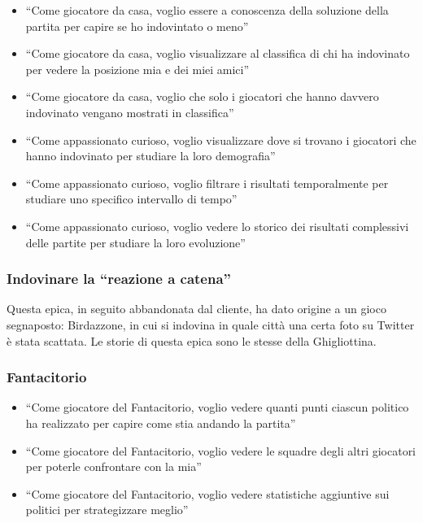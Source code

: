 \documentclass{article}
\begin{document}
\begin{itemize}
	\item ``Come giocatore da casa, voglio essere a conoscenza della soluzione
	      della partita per capire se ho indovintato o meno''
	\item ``Come giocatore da casa, voglio visualizzare al classifica di chi ha
	      indovinato per vedere la posizione mia e dei miei amici''
	\item ``Come giocatore da casa, voglio che solo i giocatori che hanno davvero
	      indovinato vengano mostrati in classifica''
	\item ``Come appassionato curioso, voglio visualizzare dove si trovano i
	      giocatori che hanno indovinato per studiare la loro demografia''
	\item ``Come appassionato curioso, voglio filtrare i risultati temporalmente
	      per studiare uno specifico intervallo di tempo''
	\item ``Come appassionato curioso, voglio vedere lo storico dei risultati
	      complessivi delle partite per studiare la loro evoluzione''
\end{itemize}

\subsubsection{Indovinare la ``reazione a catena''}

Questa epica, in seguito abbandonata dal cliente, ha dato origine a un gioco
segnaposto: Birdazzone, in cui si indovina in quale città una certa foto su
Twitter è stata scattata. Le storie di questa epica sono le stesse della
Ghigliottina.

\subsubsection{Fantacitorio}

\begin{itemize}
	\item ``Come giocatore del Fantacitorio, voglio vedere quanti punti ciascun
	      politico ha realizzato per capire come stia andando la partita''
	\item ``Come giocatore del Fantacitorio, voglio vedere le squadre degli altri
	      giocatori per poterle confrontare con la mia''
	\item ``Come giocatore del Fantacitorio, voglio vedere statistiche aggiuntive
	      sui politici per strategizzare meglio''
\end{itemize}
\end{document}

